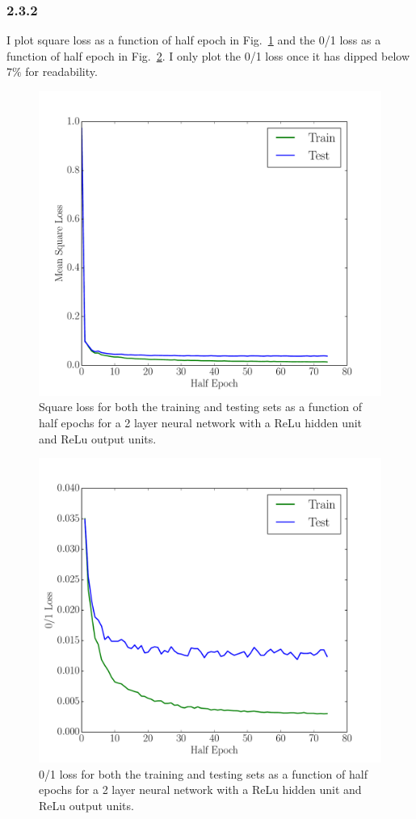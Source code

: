 \documentclass[12pt]{amsart}
\begin{document}
\subsubsection*{2.3.2}
I plot square loss as a function of half epoch in Fig.~\ref{fig:relu_relu_sq} and the 0/1 loss as a function of half epoch in Fig.~\ref{fig:relu_relu_01}.  I only plot the 0/1 loss once it has dipped below $7\%$ for readability.
\begin{figure}[H]
	\includegraphics[width=\columnwidth]{relu_relu_sq.pdf}
    \caption{Square loss for both the training and testing sets as a function of half epochs for a 2 layer neural network with a ReLu hidden unit and ReLu output units.}
    \label{fig:relu_relu_sq}
\end{figure}
\begin{figure}[H]
	\includegraphics[width=\columnwidth]{relu_relu_01.pdf}
    \caption{0/1 loss for both the training and testing sets as a function of half epochs for a 2 layer neural network with a ReLu hidden unit and ReLu output units.}
    \label{fig:relu_relu_01}
\end{figure}
\end{document}
